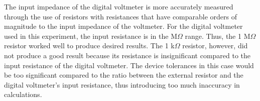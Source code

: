 \documentclass[a4paper,10pt]{article}
\begin{document}
	
The input impedance of the digital voltmeter is more accurately measured through the use of resistors with resistances that have comparable orders of magnitude to the input impedance of the voltmeter. For the digital voltmeter used in this experiment, the input resistance is in the M$\Omega$ range. Thus, the 1 M$\Omega$ resistor worked well to produce desired results. The 1 k$\Omega$ resistor, however, did not produce a good result because its resistance is insignificant compared to the input resistance of the digital voltmeter. The device tolerances in this case would be too significant compared to the ratio between the external resistor and the digital voltmeter's input resistance, thus introducing too much inaccuracy in calculations.
	
\end{document}
